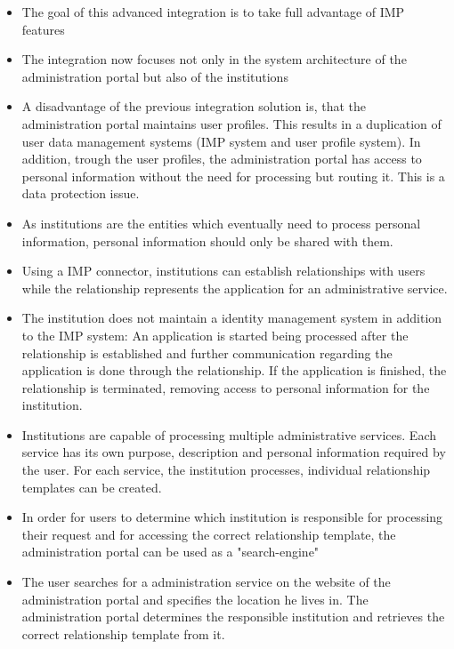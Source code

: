 
\begin{itemize}
    \item The goal of this advanced integration is to take full advantage of IMP features
    
    \item The integration now focuses not only in the system architecture of the administration portal but also of the institutions
    
    \item A disadvantage of the previous integration solution is, that the administration portal maintains user profiles. This results in a duplication of user data management systems (IMP system and user profile system). In addition, trough the user profiles, the administration portal has access to personal information without the need for processing but routing it. This is a data protection issue.
    
    \item As institutions are the entities which eventually need to process personal information, personal information should only be shared with them.
    
    \item Using a IMP connector, institutions can establish relationships with users while the relationship represents the application for an administrative service.
    
    \item The institution does not maintain a identity management system in addition to the IMP system: An application is started being processed after the relationship is established and further communication regarding the application is done through the relationship. If the application is finished, the relationship is terminated, removing access to personal information for the institution.
    
    \item Institutions are capable of processing multiple administrative services. Each service has its own purpose, description and personal information required by the user. For each service, the institution processes, individual relationship templates can be created.
    
    \item In order for users to determine which institution is responsible for processing their request and for accessing the correct relationship template, the administration portal can be used as a "search-engine"
    
    \item The user searches for a administration service on the website of the administration portal and specifies the location he lives in. The administration portal determines the responsible institution and retrieves the correct relationship template from it.
    

\end{itemize}
